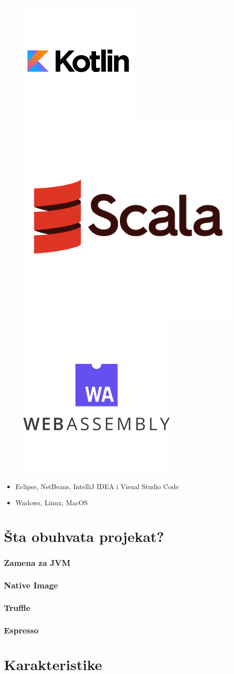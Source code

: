 \documentclass{beamer}
\begin{document}
\begin{frame}
\begin{figure}
			\includegraphics[width=0.16\linewidth]{imgs/kotlin_logo.png}
			\includegraphics[width=0.16\linewidth]{imgs/scala_logo.png}
			\includegraphics[width=0.16\linewidth]{imgs/wa_logo.png}
		\end{figure}
		
		\begin{flushleft}
			\begin{itemize}
				\item Eclipse, NetBeans, IntelliJ IDEA i Visual Studio Code
				\item Wndows, Linux, MacOS
			\end{itemize}
		\end{flushleft}
		
	
	\end{frame}	
	

	\section{Šta obuhvata projekat?}
	
	\begin{frame}
		\frametitle{Zamena za JVM}
	\end{frame}	
	
	\begin{frame}
		\frametitle{Native Image}
	\end{frame}	
	
	
	\begin{frame}
		\frametitle{Truffle}
	\end{frame}	

	\begin{frame}
		\frametitle{Espresso}
	\end{frame}	
	
		
	\section{Karakteristike}
	
\end{document}
